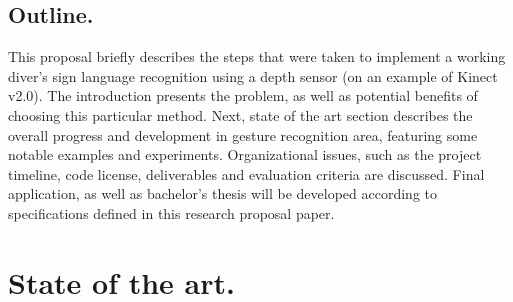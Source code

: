 \documentclass[a4paper,11pt,oneside]{article}
\begin{document}
  \subsection{Outline.}
  
  This proposal briefly describes the steps that were taken to implement a working diver's sign language recognition using a depth sensor (on an example of Kinect v2.0). The introduction presents the problem, as well as potential benefits of choosing this particular method. Next, state of the art section describes the overall progress and development in gesture recognition area, featuring some notable examples and experiments. Organizational issues, such as the project timeline, code license, deliverables and evaluation criteria are discussed. Final application, as well as bachelor's thesis will be developed according to specifications defined in this research proposal paper. 
  
  \section{State of the art.}
  
\end{document}

